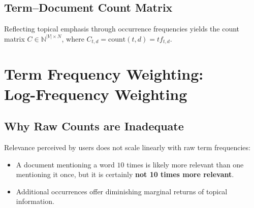 \subsection{Term--Document Count Matrix}
Reflecting topical emphasis through occurrence frequencies yields the count matrix $C \in \mathbb{N}^{|V| \times N}$, where $C_{t, d} = \text{count}(t, d) = tf_{t,d}$.

\begin{table}[H]
\centering
{}
\caption{Term--document frequency count matrix across selected Shakespearean plays.}
\label{tab:shakespeare-counts-en}
\end{table}

\FloatBarrier
\section[Term Frequency Weighting: Log-Frequency Weighting]{Term Frequency Weighting:\\ Log-Frequency Weighting}
\label{sec:log-frequency-weighting-en}

\subsection{Why Raw Counts are Inadequate}
Relevance perceived by users does not scale linearly with raw term frequencies:
\begin{itemize}
    \item A document mentioning a word $10$ times is likely more relevant than one mentioning it once, but it is certainly \textbf{not 10 times more relevant}.
    \item Additional occurrences offer diminishing marginal returns of topical information.
\end{itemize}

